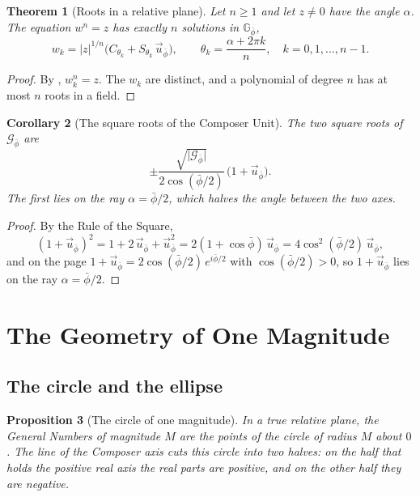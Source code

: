 \documentclass[11pt,a4paper]{amsart}
\theoremstyle{plain}
\newtheorem{theorem}{Theorem}[section]
\newtheorem{proposition}[theorem]{Proposition}
\newtheorem{corollary}[theorem]{Corollary}
\theoremstyle{definition}
\theoremstyle{remark}
\newcommand{\pb}{\bar{\phi}}                     %
\newcommand{\Gp}{\mathcal{G}_{\bar{\phi}}}       %
\newcommand{\up}{\vec{u}_{\bar{\phi}}}           %
\newcommand{\GNp}{\mathbb{G}_{\bar{\phi}}}       %
\begin{document}
\begin{theorem}[Roots in a relative plane]\label{thm:roots}
Let $n \geq 1$ and let $z \neq 0$ have the angle $\alpha$. The equation $w^n = z$ has exactly $n$ solutions in $\GNp$,
\[
w_k = \lvert z\rvert^{1/n}\bigl(C_{\theta_k} + S_{\theta_k}\,\up\bigr) , \qquad \theta_k = \frac{\alpha + 2\pi k}{n} , \quad k = 0, 1, \dots, n - 1 .
\]
\end{theorem}

\begin{proof}
By , $w_k^n = z$. The $w_k$ are distinct, and a polynomial of degree $n$ has at most $n$ roots in a field.
\end{proof}

\begin{corollary}[The square roots of the Composer Unit]\label{cor:sqrt}
The two square roots of $\Gp$ are
\[
\pm\frac{\sqrt{\lvert\Gp\rvert}}{2\cos(\pb/2)}\,\bigl(1 + \up\bigr) .
\]
The first lies on the ray $\alpha = \pb/2$, which halves the angle between the two axes.
\end{corollary}

\begin{proof}
By the Rule of the Square,
\[
(1 + \up)^2 = 1 + 2\,\up + \up^2 = 2(1 + \cos\pb)\,\up = 4\cos^2(\pb/2)\,\up ,
\]
and on the page $1 + \up = 2\cos(\pb/2)\,e^{i\pb/2}$ with $\cos(\pb/2) > 0$, so $1 + \up$ lies on the ray $\alpha = \pb/2$.
\end{proof}

\section{The Geometry of One Magnitude}\label{sec:magnitude}

\subsection{The circle and the ellipse}\label{subsec:circle-ellipse}

\begin{proposition}[The circle of one magnitude]\label{prop:circle}
In a true relative plane, the General Numbers of magnitude $M$ are the points of the circle of radius $M$ about $0$. The line of the Composer axis cuts this circle into two halves: on the half that holds the positive real axis the real parts are positive, and on the other half they are negative.
\end{proposition}
\end{document}
